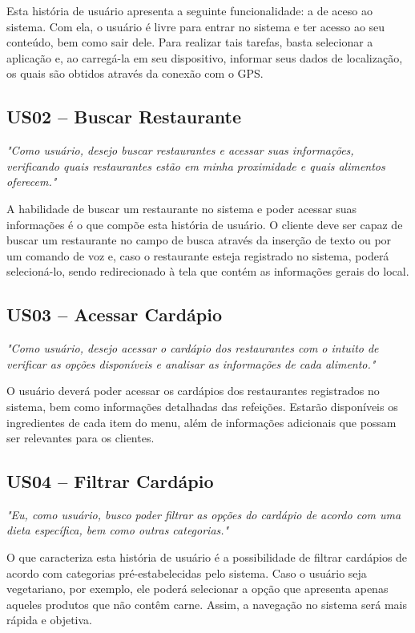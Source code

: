 Esta história de usuário apresenta a seguinte funcionalidade: a de aceso ao sistema. Com ela, o usuário é livre para entrar no sistema e ter acesso ao seu conteúdo, bem como sair dele. Para realizar tais tarefas, basta selecionar a aplicação e, ao carregá-la em seu dispositivo, informar seus dados de localização, os quais são obtidos através da conexão com o GPS.

\subsection{US02 -- Buscar Restaurante}

\textit{"Como usuário, desejo buscar restaurantes e acessar suas informações,  verificando quais restaurantes estão em minha proximidade e quais alimentos oferecem."}

A habilidade de buscar um restaurante no sistema e poder acessar suas informações é o que compõe esta história de usuário. O cliente deve ser capaz de buscar um restaurante no campo de busca através da inserção de texto ou por um comando de voz e, caso o restaurante esteja registrado no sistema, poderá selecioná-lo, sendo redirecionado à tela que contém as informações gerais do local. 

\subsection{US03 -- Acessar Cardápio}

\textit{"Como usuário, desejo acessar o cardápio dos restaurantes com o intuito de verificar as opções disponíveis e analisar as informações de cada alimento."}

O usuário deverá poder acessar os cardápios dos restaurantes registrados no sistema, bem como informações detalhadas das refeições. Estarão disponíveis os ingredientes de cada item do menu, além de informações adicionais que possam ser relevantes para os clientes.

\subsection{US04 -- Filtrar Cardápio}

\textit{"Eu, como usuário, busco poder filtrar as opções do cardápio de acordo com uma dieta específica, bem como outras categorias."}

O que caracteriza esta história de usuário é a possibilidade de filtrar cardápios de acordo com categorias pré-estabelecidas pelo sistema. Caso o usuário seja vegetariano, por exemplo, ele poderá selecionar a opção que apresenta apenas aqueles produtos que não contêm carne. Assim, a navegação no sistema será mais rápida e objetiva.

